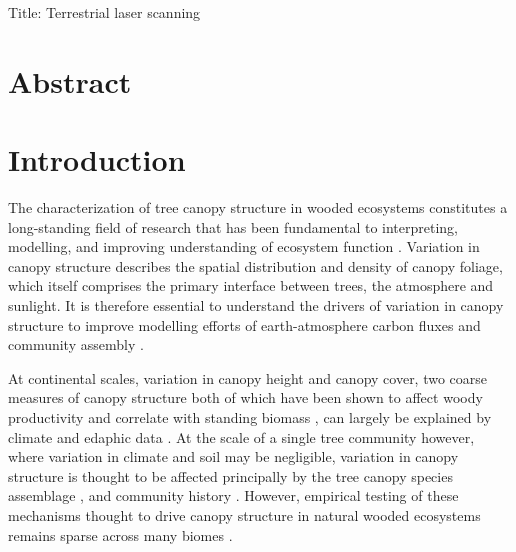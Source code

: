 \documentclass[11pt,a4paper]{article}
\newcommand{\titletext}{Terrestrial laser scanning}
\begin{document}
{\Large{Title: \titletext{}}}


\section*{Abstract}

\section{Introduction}

The characterization of tree canopy structure in wooded ecosystems constitutes a long-standing field of research that has been fundamental to interpreting, modelling, and improving understanding of ecosystem function \citep{Watt1947, Whittaker1969, Horn1971, Maarel1996}. Variation in canopy structure describes the spatial distribution and density of canopy foliage, which itself comprises the primary interface between trees, the atmosphere and sunlight. It is therefore essential to understand the drivers of variation in canopy structure to improve modelling efforts of earth-atmosphere carbon fluxes and community assembly \citep{}. 

At continental scales, variation in canopy height and canopy cover, two coarse measures of canopy structure both of which have been shown to affect woody productivity and correlate with standing biomass \citep{}, can largely be explained by climate and edaphic data \citep{SOME-GEDI}. At the scale of a single tree community however, where variation in climate and soil may be negligible, variation in canopy structure is thought to be affected principally by the tree canopy species assemblage \citep{}, and community history \citep{}. However, empirical testing of these mechanisms thought to drive canopy structure in natural wooded ecosystems remains sparse across many biomes \citep{}.
\end{document}
